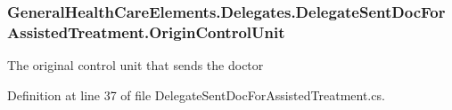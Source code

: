 \subsubsection[{\texorpdfstring{Origin\+Control\+Unit}{OriginControlUnit}}]{ General\+Health\+Care\+Elements.\+Delegates.\+Delegate\+Sent\+Doc\+For\+Assisted\+Treatment.\+Origin\+Control\+Unit\hspace{0.3cm}{\ttfamily [get]}}\hypertarget{class_general_health_care_elements_1_1_delegates_1_1_delegate_sent_doc_for_assisted_treatment_a4eda5540ec17cbe345ad46240ebbef93}{}\label{class_general_health_care_elements_1_1_delegates_1_1_delegate_sent_doc_for_assisted_treatment_a4eda5540ec17cbe345ad46240ebbef93}


The original control unit that sends the doctor 



Definition at line 37 of file Delegate\+Sent\+Doc\+For\+Assisted\+Treatment.\+cs.

